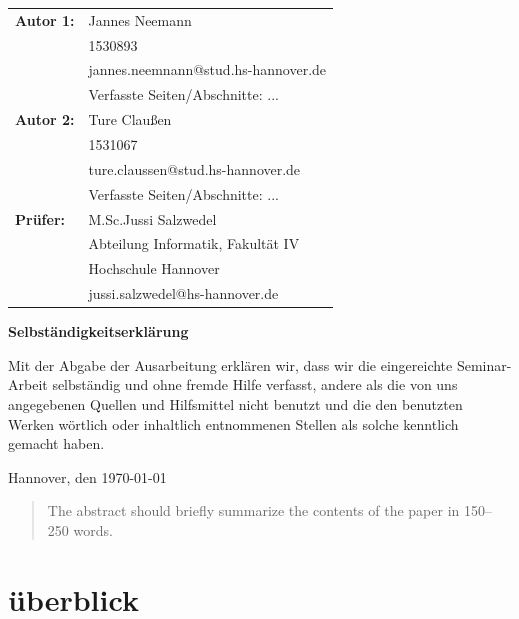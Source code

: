 \documentclass[runningheads]{llncs}
\begin{document}
  \newpage \thispagestyle{empty}
 \begin{tabular}{ll}
{\bfseries\sffamily Autor 1:} &  Jannes Neemann \\ 
            & 1530893 \\
            & jannes.neemnann@stud.hs-hannover.de \\
            & Verfasste Seiten/Abschnitte: ...
            \\[5ex]
{\bfseries\sffamily Autor 2:} & Ture Claußen \\ 
            & 1531067 \\
            & ture.claussen@stud.hs-hannover.de \\
           & Verfasste Seiten/Abschnitte: ... \\[5ex]
 {\bfseries\sffamily Prüfer:} &M.Sc.Jussi Salzwedel \\

          & Abteilung Informatik, Fakultät IV \\
         & Hochschule Hannover \\
        & jussi.salzwedel@hs-hannover.de
\end{tabular}

\vfill

\begin{center} \sffamily\bfseries Selbständigkeitserklärung \end{center}

Mit der Abgabe der Ausarbeitung erklären wir, dass wir die eingereichte Seminar-Arbeit
selbständig und ohne fremde Hilfe verfasst, andere als die von uns angegebenen Quellen
und Hilfsmittel nicht benutzt und die den benutzten Werken wörtlich oder
inhaltlich entnommenen Stellen als solche kenntlich gemacht haben. 
\vspace*{7ex}

Hannover, den \today \hfill 

\pagebreak

  \tableofcontents  %

\pagebreak

\begin{abstract}
The abstract should briefly summarize the contents of the paper in
150--250 words.

\end{abstract}
%
%
%
\section{überblick}
\cite{andreas_m._antonopoulos_gavin_wood_ethereumbook/ethereumbook_2020}



\end{document}
